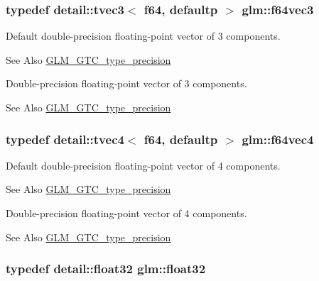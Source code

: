 \hypertarget{group__gtc__type__precision_ga794ee8f0a105cda01946cd9860f492a8}{
\subsubsection[{f64vec3}]{\setlength{\rightskip}{0pt plus 5cm}typedef detail\-::tvec3$<$ f64, defaultp $>$ {\bf glm\-::f64vec3}}}\label{group__gtc__type__precision_ga794ee8f0a105cda01946cd9860f492a8}
Default double-\/precision floating-\/point vector of 3 components. \begin{DoxySeeAlso}{See Also}
\hyperlink{group__gtc__type__precision}{G\-L\-M\-\_\-\-G\-T\-C\-\_\-type\-\_\-precision}
\end{DoxySeeAlso}
Double-\/precision floating-\/point vector of 3 components. \begin{DoxySeeAlso}{See Also}
\hyperlink{group__gtc__type__precision}{G\-L\-M\-\_\-\-G\-T\-C\-\_\-type\-\_\-precision} 
\end{DoxySeeAlso}
\hypertarget{group__gtc__type__precision_gac10d088c5f1d16a62fb019408af34e1b}{
\subsubsection[{f64vec4}]{\setlength{\rightskip}{0pt plus 5cm}typedef detail\-::tvec4$<$ f64, defaultp $>$ {\bf glm\-::f64vec4}}}\label{group__gtc__type__precision_gac10d088c5f1d16a62fb019408af34e1b}
Default double-\/precision floating-\/point vector of 4 components. \begin{DoxySeeAlso}{See Also}
\hyperlink{group__gtc__type__precision}{G\-L\-M\-\_\-\-G\-T\-C\-\_\-type\-\_\-precision}
\end{DoxySeeAlso}
Double-\/precision floating-\/point vector of 4 components. \begin{DoxySeeAlso}{See Also}
\hyperlink{group__gtc__type__precision}{G\-L\-M\-\_\-\-G\-T\-C\-\_\-type\-\_\-precision} 
\end{DoxySeeAlso}
\hypertarget{group__gtc__type__precision_ga814f2f65354b6588b067cc5c67a6b340}{
\subsubsection[{float32}]{\setlength{\rightskip}{0pt plus 5cm}typedef detail\-::float32 {\bf glm\-::float32}}}\label{group__gtc__type__precision_ga814f2f65354b6588b067cc5c67a6b340}

